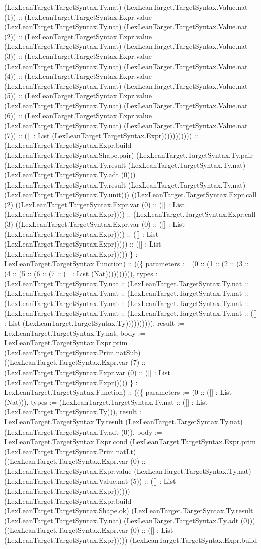 \documentclass[11pt]{article}
\begin{document}
(LexLeanTarget.TargetSyntax.Ty.nat) (LexLeanTarget.TargetSyntax.Value.nat (1)) :: (LexLeanTarget.TargetSyntax.Expr.value (LexLeanTarget.TargetSyntax.Ty.nat) (LexLeanTarget.TargetSyntax.Value.nat (2)) :: (LexLeanTarget.TargetSyntax.Expr.value (LexLeanTarget.TargetSyntax.Ty.nat) (LexLeanTarget.TargetSyntax.Value.nat (3)) :: (LexLeanTarget.TargetSyntax.Expr.value (LexLeanTarget.TargetSyntax.Ty.nat) (LexLeanTarget.TargetSyntax.Value.nat (4)) :: (LexLeanTarget.TargetSyntax.Expr.value (LexLeanTarget.TargetSyntax.Ty.nat) (LexLeanTarget.TargetSyntax.Value.nat (5)) :: (LexLeanTarget.TargetSyntax.Expr.value (LexLeanTarget.TargetSyntax.Ty.nat) (LexLeanTarget.TargetSyntax.Value.nat (6)) :: (LexLeanTarget.TargetSyntax.Expr.value (LexLeanTarget.TargetSyntax.Ty.nat) (LexLeanTarget.TargetSyntax.Value.nat (7)) :: ([] : List (LexLeanTarget.TargetSyntax.Expr))))))))))) :: (LexLeanTarget.TargetSyntax.Expr.build (LexLeanTarget.TargetSyntax.Shape.pair) (LexLeanTarget.TargetSyntax.Ty.pair (LexLeanTarget.TargetSyntax.Ty.result (LexLeanTarget.TargetSyntax.Ty.nat) (LexLeanTarget.TargetSyntax.Ty.adt (0))) (LexLeanTarget.TargetSyntax.Ty.result (LexLeanTarget.TargetSyntax.Ty.nat) (LexLeanTarget.TargetSyntax.Ty.unit))) ((LexLeanTarget.TargetSyntax.Expr.call (2) ((LexLeanTarget.TargetSyntax.Expr.var (0) :: ([] : List (LexLeanTarget.TargetSyntax.Expr)))) :: (LexLeanTarget.TargetSyntax.Expr.call (3) ((LexLeanTarget.TargetSyntax.Expr.var (0) :: ([] : List (LexLeanTarget.TargetSyntax.Expr)))) :: ([] : List (LexLeanTarget.TargetSyntax.Expr))))) :: ([] : List (LexLeanTarget.TargetSyntax.Expr))))) \} : LexLeanTarget.TargetSyntax.Function) :: ((\{ parameters := (0 :: (1 :: (2 :: (3 :: (4 :: (5 :: (6 :: (7 :: ([] : List (Nat)))))))))), types := (LexLeanTarget.TargetSyntax.Ty.nat :: (LexLeanTarget.TargetSyntax.Ty.nat :: (LexLeanTarget.TargetSyntax.Ty.nat :: (LexLeanTarget.TargetSyntax.Ty.nat :: (LexLeanTarget.TargetSyntax.Ty.nat :: (LexLeanTarget.TargetSyntax.Ty.nat :: (LexLeanTarget.TargetSyntax.Ty.nat :: (LexLeanTarget.TargetSyntax.Ty.nat :: ([] : List (LexLeanTarget.TargetSyntax.Ty)))))))))), result := LexLeanTarget.TargetSyntax.Ty.nat, body := LexLeanTarget.TargetSyntax.Expr.prim (LexLeanTarget.TargetSyntax.Prim.natSub) ((LexLeanTarget.TargetSyntax.Expr.var (7) :: (LexLeanTarget.TargetSyntax.Expr.var (0) :: ([] : List (LexLeanTarget.TargetSyntax.Expr))))) \} : LexLeanTarget.TargetSyntax.Function) :: ((\{ parameters := (0 :: ([] : List (Nat))), types := (LexLeanTarget.TargetSyntax.Ty.nat :: ([] : List (LexLeanTarget.TargetSyntax.Ty))), result := LexLeanTarget.TargetSyntax.Ty.result (LexLeanTarget.TargetSyntax.Ty.nat) (LexLeanTarget.TargetSyntax.Ty.adt (0)), body := LexLeanTarget.TargetSyntax.Expr.cond (LexLeanTarget.TargetSyntax.Expr.prim (LexLeanTarget.TargetSyntax.Prim.natLt) ((LexLeanTarget.TargetSyntax.Expr.var (0) :: (LexLeanTarget.TargetSyntax.Expr.value (LexLeanTarget.TargetSyntax.Ty.nat) (LexLeanTarget.TargetSyntax.Value.nat (5)) :: ([] : List (LexLeanTarget.TargetSyntax.Expr)))))) (LexLeanTarget.TargetSyntax.Expr.build (LexLeanTarget.TargetSyntax.Shape.ok) (LexLeanTarget.TargetSyntax.Ty.result (LexLeanTarget.TargetSyntax.Ty.nat) (LexLeanTarget.TargetSyntax.Ty.adt (0))) ((LexLeanTarget.TargetSyntax.Expr.var (0) :: ([] : List (LexLeanTarget.TargetSyntax.Expr))))) (LexLeanTarget.TargetSyntax.Expr.build 
\end{document}
